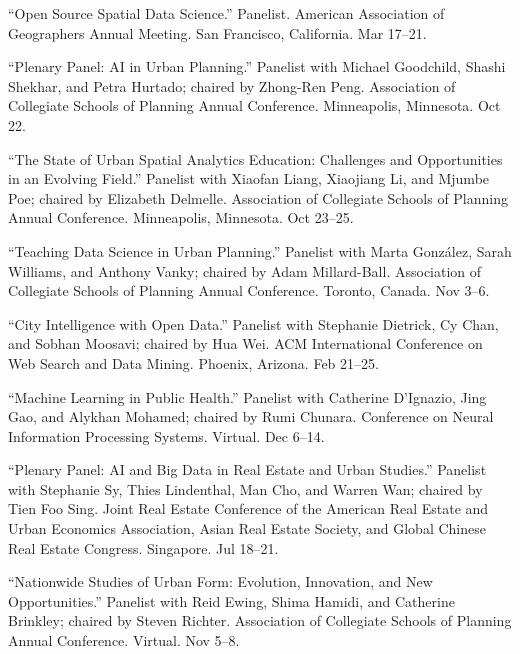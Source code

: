 \documentclass[11pt,a4paper]{report} %
\begin{document}
\begin{tablist}

\item[2026] \tab{}\enquote{Open Source Spatial Data Science.} Panelist. American Association of Geographers Annual Meeting. San Francisco, California. Mar 17--21.

\item[2025] \tab{}\enquote{Plenary Panel: AI in Urban Planning.} Panelist with Michael Goodchild, Shashi Shekhar, and Petra Hurtado; chaired by Zhong-Ren Peng. Association of Collegiate Schools of Planning Annual Conference. Minneapolis, Minnesota. Oct 22.

\item[2025] \tab{}\enquote{The State of Urban Spatial Analytics Education: Challenges and Opportunities in an Evolving Field.} Panelist with Xiaofan Liang, Xiaojiang Li, and Mjumbe Poe; chaired by Elizabeth Delmelle. Association of Collegiate Schools of Planning Annual Conference. Minneapolis, Minnesota. Oct 23--25.

\item[2022] \tab{}\enquote{Teaching Data Science in Urban Planning.} Panelist with Marta Gonz{\'a}lez, Sarah Williams, and Anthony Vanky; chaired by Adam Millard-Ball. Association of Collegiate Schools of Planning Annual Conference. Toronto, Canada. Nov 3--6.

\item[2022] \tab{}\enquote{City Intelligence with Open Data.} Panelist with Stephanie Dietrick, Cy Chan, and Sobhan Moosavi; chaired by Hua Wei. ACM International Conference on Web Search and Data Mining. Phoenix, Arizona. Feb 21--25.

\item[2021] \tab{}\enquote{Machine Learning in Public Health.} Panelist with Catherine D'Ignazio, Jing Gao, and Alykhan Mohamed; chaired by Rumi Chunara. Conference on Neural Information Processing Systems. Virtual. Dec 6--14.

\item[2021] \tab{}\enquote{Plenary Panel: AI and Big Data in Real Estate and Urban Studies.} Panelist with Stephanie Sy, Thies Lindenthal, Man Cho, and Warren Wan; chaired by Tien Foo Sing. Joint Real Estate Conference of the American Real Estate and Urban Economics Association, Asian Real Estate Society, and Global Chinese Real Estate Congress. Singapore. Jul 18--21.

\item[2020] \tab{}\enquote{Nationwide Studies of Urban Form: Evolution, Innovation, and New Opportunities.} Panelist with Reid Ewing, Shima Hamidi, and Catherine Brinkley; chaired by Steven Richter. Association of Collegiate Schools of Planning Annual Conference. Virtual. Nov 5--8.


\end{tablist}
\end{document}
